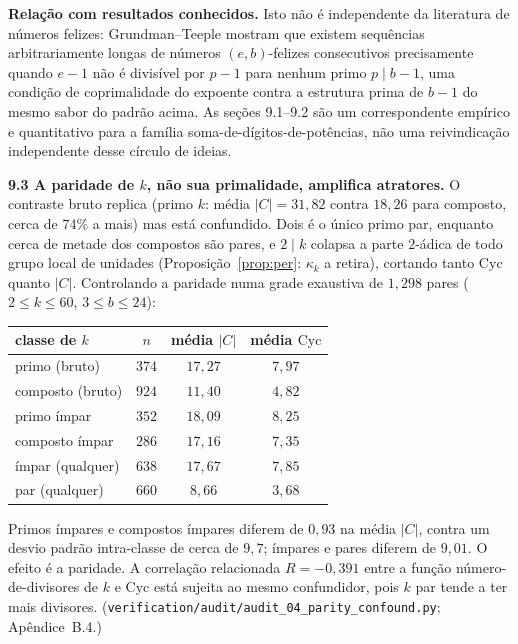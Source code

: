 \documentclass[11pt]{article}
\theoremstyle{definition}
\theoremstyle{remark}
\newcommand{\Cyc}{\mathrm{Cyc}}
\begin{document}
\textbf{Relação com resultados conhecidos.} Isto não é independente da literatura de números felizes: Grundman--Teeple \cite{GT07} mostram que existem sequências arbitrariamente longas de números $(e,b)$-felizes consecutivos precisamente quando $e-1$ não é divisível por $p-1$ para nenhum primo $p \mid b-1$, uma condição de coprimalidade do expoente contra a estrutura prima de $b-1$ do mesmo sabor do padrão acima. As seções 9.1--9.2 são um correspondente empírico e quantitativo para a família soma-de-dígitos-de-potências, não uma reivindicação independente desse círculo de ideias.

\medskip
\noindent\textbf{9.3 A paridade de $k$, não sua primalidade, amplifica atratores.} O contraste bruto replica (primo $k$: média $|C| = 31{,}82$ contra $18{,}26$ para composto, cerca de $74\%$ a mais) mas está confundido. Dois é o único primo par, enquanto cerca de metade dos compostos são pares, e $2 \mid k$ colapsa a parte $2$-ádica de todo grupo local de unidades (Proposição~\ref{prop:per}: $\kappa_k$ a retira), cortando tanto $\Cyc$ quanto $|C|$. Controlando a paridade numa grade exaustiva de $1{,}298$ pares ($2 \le k \le 60$, $3 \le b \le 24$):

\begin{center}
\begin{tabular}{@{}lccc@{}}
\toprule
classe de $k$ & $n$ & média $|C|$ & média $\Cyc$ \\
\midrule
primo (bruto) & $374$ & $17{,}27$ & $7{,}97$ \\
composto (bruto) & $924$ & $11{,}40$ & $4{,}82$ \\
primo ímpar & $352$ & $18{,}09$ & $8{,}25$ \\
composto ímpar & $286$ & $17{,}16$ & $7{,}35$ \\
ímpar (qualquer) & $638$ & $17{,}67$ & $7{,}85$ \\
par (qualquer) & $660$ & $8{,}66$ & $3{,}68$ \\
\bottomrule
\end{tabular}
\end{center}

Primos ímpares e compostos ímpares diferem de $0{,}93$ na média $|C|$, contra um desvio padrão intra-classe de cerca de $9{,}7$; ímpares e pares diferem de $9{,}01$. O efeito é a paridade. A correlação relacionada $R = -0{,}391$ entre a função número-de-divisores de $k$ e $\Cyc$ está sujeita ao mesmo confundidor, pois $k$ par tende a ter mais divisores. (\texttt{verification/audit/audit\_04\_parity\_confound.py}; Apêndice~B.4.)
\end{document}
